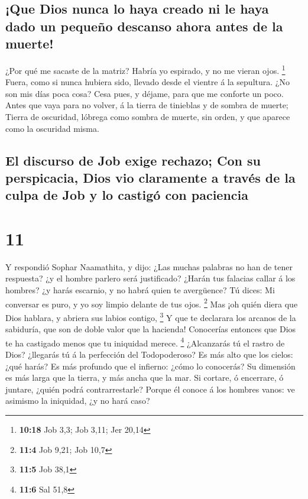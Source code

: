 \hypertarget{que-dios-nunca-lo-haya-creado-ni-le-haya-dado-un-pequeuxf1o-descanso-ahora-antes-de-la-muerte}{%
\subsection{¡Que Dios nunca lo haya creado ni le haya dado un pequeño
descanso ahora antes de la
muerte!}\label{que-dios-nunca-lo-haya-creado-ni-le-haya-dado-un-pequeuxf1o-descanso-ahora-antes-de-la-muerte}}

 ¿Por qué me sacaste de la matriz? Habría yo espirado, y
no me vieran ojos. \footnote{\textbf{10:18} Job 3,3; Job 3,11; Jer 20,14}
 Fuera, como si nunca hubiera sido, llevado desde el
vientre á la sepultura.  ¿No son mis días poca cosa? Cesa
pues, y déjame, para que me conforte un poco.  Antes que
vaya para no volver, á la tierra de tinieblas y de sombra de muerte;
 Tierra de oscuridad, lóbrega como sombra de muerte, sin
orden, y que aparece como la oscuridad misma.

\hypertarget{el-discurso-de-job-exige-rechazo-con-su-perspicacia-dios-vio-claramente-a-travuxe9s-de-la-culpa-de-job-y-lo-castiguxf3-con-paciencia}{%
\subsection{El discurso de Job exige rechazo; Con su perspicacia, Dios
vio claramente a través de la culpa de Job y lo castigó con
paciencia}\label{el-discurso-de-job-exige-rechazo-con-su-perspicacia-dios-vio-claramente-a-travuxe9s-de-la-culpa-de-job-y-lo-castiguxf3-con-paciencia}}

\hypertarget{section-10}{%
\section{11}\label{section-10}}

 Y respondió Sophar Naamathita, y dijo: 
¿Las muchas palabras no han de tener respuesta? ¿y el hombre parlero
será justificado?  ¿Harán tus falacias callar á los
hombres? ¿y harás escarnio, y no habrá quien te avergüence?
 Tú dices: Mi conversar es puro, y yo soy limpio delante
de tus ojos. \footnote{\textbf{11:4} Job 9,21; Job 10,7} 
Mas ¡oh quién diera que Dios hablara, y abriera sus labios contigo,
\footnote{\textbf{11:5} Job 38,1}  Y que te declarara los
arcanos de la sabiduría, que son de doble valor que la hacienda!
Conocerías entonces que Dios te ha castigado menos que tu iniquidad
merece. \footnote{\textbf{11:6} Sal 51,8}  ¿Alcanzarás tú
el rastro de Dios? ¿llegarás tú á la perfección del Todopoderoso?
 Es más alto que los cielos: ¿qué harás? Es más profundo
que el infierno: ¿cómo lo conocerás?  Su dimensión es más
larga que la tierra, y más ancha que la mar.  Si cortare,
ó encerrare, ó juntare, ¿quién podrá contrarrestarle? 
Porque él conoce á los hombres vanos: ve asimismo la iniquidad, ¿y no
hará caso?

